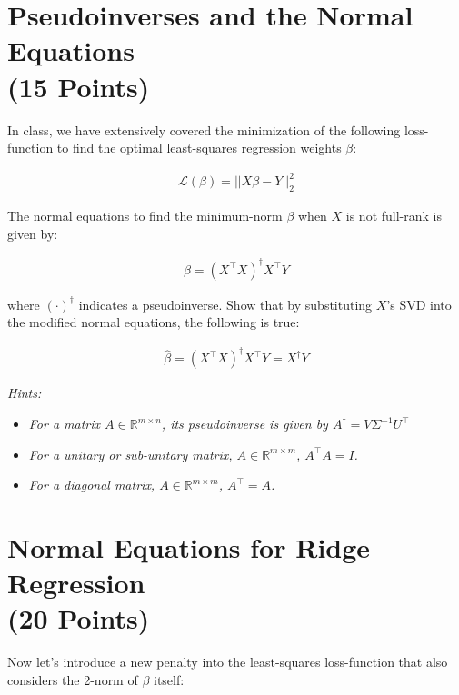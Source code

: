 \documentclass[12pt,letterpaper]{article}
\newcommand{\R}{\mathbb{R}}
\begin{document}
\vfill 

\pagebreak 

\section{Pseudoinverses and the Normal Equations \\ {\large (15 Points)}}


In class, we have extensively covered the minimization of the following loss-function to find the optimal least-squares regression weights $\beta$:

\begin{align}
    \mathcal{L}(\beta) = || X \beta - Y||_2^2
\end{align}

The normal equations to find the minimum-norm $\beta$ when $X$ is not full-rank is given by: 

\begin{align}
    \hat{\beta} = (X^\top X)^\dagger X^\top Y
\end{align}

where $(\cdot)^\dagger$ indicates a pseudoinverse. Show that by substituting $X$'s SVD into the modified normal equations, the following is true:  

\begin{align}
    \hat{\beta} = (X^\top X)^\dagger X^\top Y = X^\dagger Y
\end{align}

\textit{Hints:} 
\begin{itemize}
    \item \textit{For a matrix $A \in \R^{m \times n}$, its pseudoinverse is given by $ A^\dagger = V \Sigma^{-1} U^\top $}
    \item \textit{For a unitary or sub-unitary matrix, $A \in \R^{m \times m}$, $A^\top A = I $. }
    \item \textit{For a diagonal matrix, $A \in \R^{m \times m}$, $A^\top = A$. }
\end{itemize}

\vfill \pagebreak 

\section{Normal Equations for Ridge Regression\\ \large (20 Points) }

Now let's introduce a new penalty into the least-squares loss-function that also considers the 2-norm of $\beta$ itself: 
\end{document}
